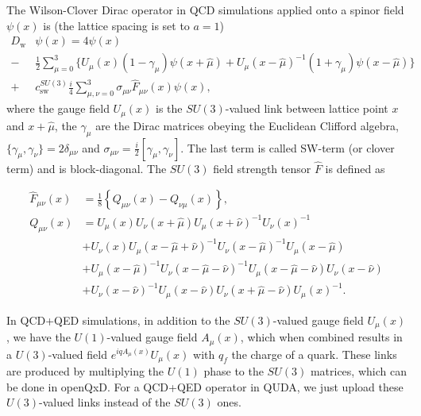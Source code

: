 The Wilson-Clover Dirac operator in QCD simulations applied onto a spinor field $\psi(x)$ is (the lattice spacing is set to $a = 1$)
\begin{equation}
\begin{aligned} \label{eq:Dw}
D_\mathrm{w} &\psi(x) = 4 \psi(x) \\
-&\frac{1}{2} \sum_{\mu=0}^3 \Big\{
  U_{\mu}(x) (1-\gamma_{\mu}) \psi(x + \hat{\mu})
+ U_{\mu}(x-\hat{\mu})^{-1} (1+\gamma_{\mu}) \psi(x-\hat{\mu})
\Big\} \\
+&c_\mathrm{sw}^{SU(3)} \frac{i}{4} \sum_{\mu,\nu=0}^3 \sigma_{\mu \nu} \hat{F}_{\mu \nu}(x) \psi(x),
\end{aligned}
\end{equation}
where the gauge field $U_{\mu}(x)$ is the $SU(3)$-valued link between lattice point $x$ and $x + \hat{\mu}$, the $\gamma_{\mu}$ are the Dirac matrices obeying the Euclidean Clifford algebra, $\{\gamma_{\mu}, \gamma_{\nu}\} = 2 \delta_{\mu \nu}$ and $\sigma_{\mu \nu} = \frac{i}{2} \left[\gamma_{\mu}, \gamma_{\nu}\right]$. The last term is called SW-term (or clover term) and is block-diagonal. The $SU(3)$ field strength tensor $\hat{F}$ is defined as

\begin{align*}
\hat{F}_{\mu \nu}(x) &= \frac{1}{8} \left\{
    Q_{\mu \nu}(x) - Q_{\nu \mu}(x)
\right\}, \\
Q_{\mu \nu}(x)
&= U_{\mu}(x)
   U_{\nu}(x+\hat{\mu})
   U_{\mu}(x+\hat{\nu})^{-1}
   U_{\nu}(x)^{-1} \\
&+ U_{\nu}(x)
   U_{\mu}(x-\hat{\mu}+\hat{\nu})^{-1}
   U_{\nu}(x-\hat{\mu})^{-1}
   U_{\mu}(x-\hat{\mu}) \\
&+ U_{\mu}(x-\hat{\mu})^{-1}
   U_{\nu}(x-\hat{\mu}-\hat{\nu})^{-1}
   U_{\mu}(x-\hat{\mu}-\hat{\nu})
   U_{\nu}(x-\hat{\nu}) \\
&+ U_{\nu}(x-\hat{\nu})^{-1}
   U_{\mu}(x-\hat{\nu})
   U_{\nu}(x+\hat{\mu}-\hat{\nu})
   U_{\mu}(x)^{-1}.
\end{align*}

In QCD+QED simulations, in addition to the $SU(3)$-valued gauge field $U_\mu(x)$, we have the $U(1)$-valued gauge field $A_\mu(x)$, which when combined results
in a $U(3)$-valued field $e^{i q A_\mu(x)} U_\mu(x)$ with $q_f$ the charge of a quark. These links are produced by multiplying the $U(1)$ phase to the $SU(3)$ matrices, which can be done in openQxD. For a QCD+QED operator in QUDA, we just upload these $U(3)$-valued links instead of the $SU(3)$ ones.

